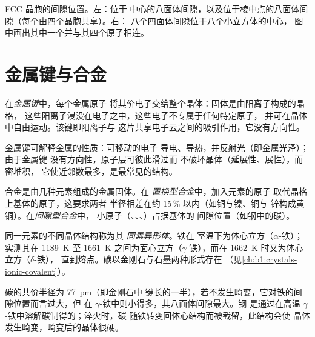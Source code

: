 \begin{omfigure}
{\small FCC 晶胞的间隙位置。左：位于
中心的八面体间隙，以及位于棱中点的八面体间隙（每个由四个晶胞共享）。右：
八个四面体间隙位于八个小立方体的中心，
图中画出其中一个并与其四个原子相连。}
\end{omfigure}

\section{金属键与合金}

\begin{definition}[金属键]\label{def:b1:crystals-metals:metallic-bond}
在\emph{金属键}中，每个金属原子
将其价电子交给整个晶体：固体是由阳离子构成的晶格，
这些阳离子浸没在电子之中，这些电子不专属于任何特定原子，
并可在晶体中自由运动。该键即阳离子与
这片共享电子云之间的吸引作用，它没有方向性。
\end{definition}

\begin{proposition}[金属的性质]\label{prop:b1:crystals-metals:properties}
金属键可解释金属的性质：可移动的电子
导电、导热，并反射光（即金属光泽）；由于金属键
没有方向性，原子层可彼此滑过而
不破坏晶体（延展性、展性），而密堆积，
它使近邻数最多，是最常见的结构。
\end{proposition}
\admitted

\begin{definition}[合金]\label{def:b1:crystals-metals:alloy}
合金是由几种元素组成的金属固体。在
\emph{置换型合金}中，加入元素的原子
取代晶格上基体的原子，这要求两者
半径相差在约 15\,\% 以内（如铜与镍、铜与
锌构成黄铜）。在\emph{间隙型合金}中，
小原子（、、、）占据基体的
间隙位置（如钢中的碳）。
\end{definition}

\begin{definition}[同素异形体]\label{def:b1:crystals-metals:allotropy}
同一元素的不同晶体结构称为其
\emph{同素异形体}。铁在
室温下为体心立方（$\alpha$-铁）；实测其在 \qty{1189}{K} 至
\qty{1661}{K} 之间为面心立方（$\gamma$-铁），而在 \qty{1662}{K} 时又为体心立方（$\delta$-铁），
直到熔点。碳以金刚石与石墨两种形式存在
（见\cref{ch:b1:crystals-ionic-covalent}）。
\end{definition}

\begin{example}[钢]\label{ex:b1:crystals-metals:steel}
碳的共价半径为 \qty{77}{pm}（即金刚石中 
键长的一半），若不发生畸变，它对铁的间隙位置而言过大，但
在 $\gamma$-铁中则小得多，其八面体间隙最大。钢
是通过在高温 $\gamma$-铁中溶解碳制得的；淬火时，碳
随铁转变回体心结构而被截留，此结构会使
晶体发生畸变，畸变后的晶体很硬。
\end{example}


